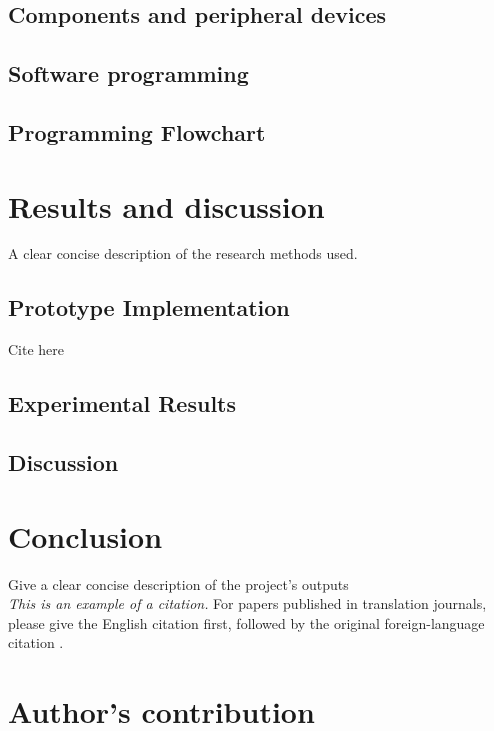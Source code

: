 \documentclass[conference, onecolumn]{IEEEtran}
\begin{document}
\subsection{Components and peripheral devices}

\subsection{Software programming}

\subsection{Programming Flowchart}

\section{Results and discussion}
A clear concise description of the research methods used.\\

\subsection{Prototype Implementation}
Cite here \cite{Tellez_2016}

\subsection{Experimental Results}

\subsection{Discussion}


\section{Conclusion}
Give a clear concise description of the project’s outputs \cite{Li_2018} \\

\emph{This is an example of a citation.}
For papers published in translation journals, please give the English citation first, followed by the original foreign-language citation \cite{dang2014her,anh2020waste,Khorov_2018,dang2015hybrid}  \cite{pham_jit}.

\section{Author's contribution}
\end{document}
